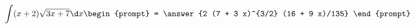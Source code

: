 \documentclass{ximera}
\author{Steven Gubkin}
\begin{document}
\begin{exercise}


\[
\int (x+2)\sqrt{3x+7} \d x \begin{prompt} = \answer{2 (7 + 3 x)^{3/2} (16 + 9 x)/135} \end{prompt}
\]

\end{exercise}
\end{document}
